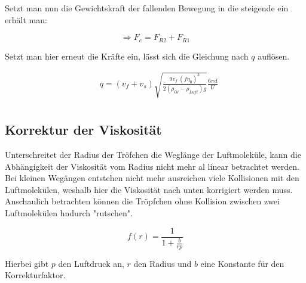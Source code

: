Setzt man nun die Gewichtskraft der fallenden Bewegung in die steigende ein erhält man:

\begin{equation}
    \Rightarrow F_e = F_{R2} + F_{R1}
\end{equation}

Setzt man hier erneut die Kräfte ein, lässt sich die Gleichung nach $q$ auflösen.

\begin{align}
    &q = (v_f + v_s)\sqrt{\frac{9 v_f\ (f\eta_0)^3}{2 (\rho_{Öl}- \rho_{Luft}) g}}\frac{6 \pi d}{U} \\ \label{eq:q}
\end{align}

\subsection{Korrektur der Viskosität}

Unterschreitet der Radius der Tröfchen die Weglänge der Luftmoleküle, kann die Abhängigkeit der Viskosität vom Radius nicht mehr al linear betrachtet werden.
Bei kleinen Wegängen entstehen nicht mehr ausreichen viele Kollisionen mit den Luftmolekülen, weshalb hier die Viskosität nach unten korrigiert werden muss.
Anschaulich betrachten können die Tröpfchen ohne Kollision zwischen zwei Luftmolekülen hndurch "rutschen".

\begin{equation}
    f(r) = \frac{1}{1+\tfrac{b}{rp}}
    \label{eq:f}
\end{equation}

Hierbei gibt $p$ den Luftdruck an, $r$ den Radius und $b$ eine Konstante für den Korrekturfaktor.